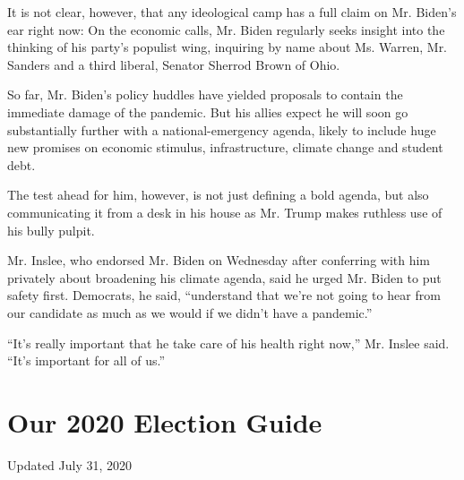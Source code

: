 It is not clear, however, that any ideological camp has a full claim on
Mr. Biden's ear right now: On the economic calls, Mr. Biden regularly
seeks insight into the thinking of his party's populist wing, inquiring
by name about Ms. Warren, Mr. Sanders and a third liberal, Senator
Sherrod Brown of Ohio.

So far, Mr. Biden's policy huddles have yielded proposals to contain the
immediate damage of the pandemic. But his allies expect he will soon go
substantially further with a national-emergency agenda, likely to
include huge new promises on economic stimulus, infrastructure, climate
change and student debt.

The test ahead for him, however, is not just defining a bold agenda, but
also communicating it from a desk in his house as Mr. Trump makes
ruthless use of his bully pulpit.

Mr. Inslee, who endorsed Mr. Biden on Wednesday after conferring with
him privately about broadening his climate agenda, said he urged Mr.
Biden to put safety first. Democrats, he said, ``understand that we're
not going to hear from our candidate as much as we would if we didn't
have a pandemic.''

``It's really important that he take care of his health right now,'' Mr.
Inslee said. ``It's important for all of us.''

\hypertarget{our-2020-election-guide}{%
\section{Our 2020 Election Guide}\label{our-2020-election-guide}}

Updated July 31, 2020

